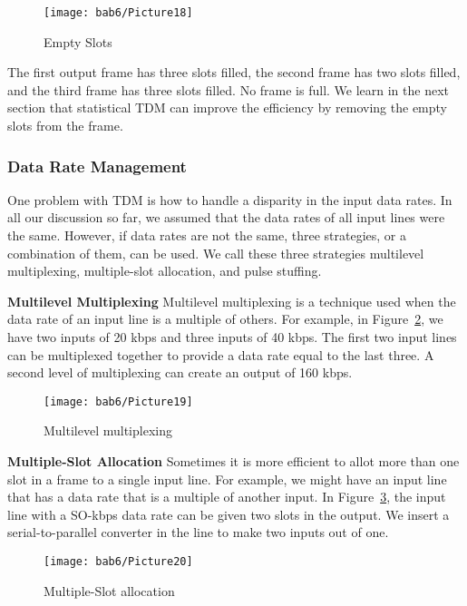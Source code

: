 \begin{figure}[htbp]
  \centering
  \texttt{[image: bab6/Picture18]}
  \caption{Empty Slots}
  \label{fig6:17}
\end{figure}

The first output frame has three slots filled, the second frame has two slots filled, and the third frame has three slots filled. No frame is full. We learn in the next section that statistical TDM can improve the efficiency by removing the empty slots from the frame.

\subsubsection*{Data Rate Management}
One problem with TDM is how to handle a disparity in the input data rates. In all our discussion so far, we assumed that the data rates of all input lines were the same. However, if data rates are not the same, three strategies, or a combination of them, can be used. We call these three strategies multilevel multiplexing, multiple-slot allocation, and pulse stuffing.

\textbf{Multilevel Multiplexing} Multilevel multiplexing is a technique used when the data rate of an input line is a multiple of others. For example, in Figure~\ref{fig6:18}, we have two inputs of 20 kbps and three inputs of 40 kbps. The first two input lines can be multiplexed together to provide a data rate equal to the last three. A second level of multiplexing can create an output of 160 kbps.

\begin{figure}[htbp]
  \centering
  \texttt{[image: bab6/Picture19]}
  \caption{Multilevel multiplexing}
  \label{fig6:18}
\end{figure}

\textbf{Multiple-Slot Allocation} Sometimes it is more efficient to allot more than one slot in a frame to a single input line. For example, we might have an input line that has a data rate that is a multiple of another input. In Figure~\ref{fig6:19}, the input line with a SO-kbps data rate can be given two slots in the output. We insert a serial-to-parallel converter in the line to make two inputs out of one.

\begin{figure}[htbp]
  \centering
  \texttt{[image: bab6/Picture20]}
  \caption{Multiple-Slot allocation}
  \label{fig6:19}
\end{figure}

